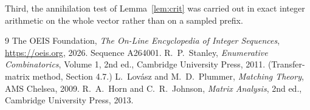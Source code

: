\documentclass[11pt,a4paper]{article}
\theoremstyle{plain}
\theoremstyle{definition}
\begin{document}
Third, the annihilation test of Lemma~\ref{lem:crit} was carried out in exact integer
arithmetic on the whole vector rather than on a sampled prefix.

\begin{thebibliography}{9}
 The OEIS Foundation, \emph{The On-Line Encyclopedia of Integer
Sequences}, \url{https://oeis.org}, 2026. Sequence A264001.
 R.~P.~Stanley, \emph{Enumerative Combinatorics}, Volume 1, 2nd ed.,
Cambridge University Press, 2011. (Transfer-matrix method, Section 4.7.)
 L.~Lov\'asz and M.~D.~Plummer, \emph{Matching Theory}, AMS Chelsea, 2009.
 R.~A.~Horn and C.~R.~Johnson, \emph{Matrix Analysis}, 2nd ed., Cambridge
University Press, 2013.
\end{thebibliography}
\end{document}
